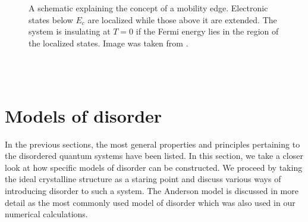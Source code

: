 \documentclass[10pt,a4paper]{article}
\begin{document}
\begin{minipage}[t]{0.45\textwidth} 
\begin{figure}[H]
\caption{A schematic explaining the concept of a mobility edge. Electronic states below $E_c$ are localized while those above it are extended. The system is insulating at $T=0$ if the Fermi energy lies in the region of the localized states. Image was taken from \cite{Kramer}.  }
\label{fig:band_structure} 
\end{figure}
\end{minipage}\\\\
\section{Models of disorder }
\label{sec:disorder}
In the previous sections, the most general properties and principles pertaining to the disordered quantum systems have been listed. In this section, we take a closer look at how specific models of disorder can be constructed. We proceed by taking the ideal crystalline structure as a staring point and discuss various ways of introducing disorder to such a system. The Anderson model is discussed in more detail as the most commonly used model of disorder which was also used in our numerical calculations. \\\\
\noindent
\end{document}
